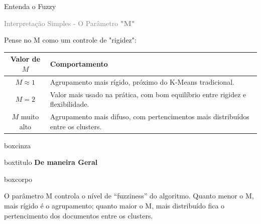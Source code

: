 \documentclass[aspectratio=43]{beamer}
\begin{document}
\begin{frame}[t]{Entenda o Fuzzy}

\textcolor{gray}{\large Interpretação Simples - O Parâmetro \textbf{"M"}}

\vspace{0.3cm}

Pense no M como um controle de "rigidez":

\begin{center}
\footnotesize
\begin{tabular}{|c|P{6.5cm}|}
\hline
\textbf{Valor de $M$} & \textbf{Comportamento} \\
\hline
$M \approx 1$ & Agrupamento mais rígido, próximo do K-Means tradicional. \\
\hline
$M = 2$ & Valor mais usado na prática, com bom equilíbrio entre rigidez e flexibilidade. \\
\hline
$M$ muito alto & Agrupamento mais difuso, com pertencimentos mais distribuídos entre os clusters. \\
\hline
\end{tabular}
\end{center}

\vspace{0.2cm}

\begin{center}
\begin{beamercolorbox}[
    wd=0.80\paperwidth,
    sep=0pt
]{boxcinza}

    \begin{beamercolorbox}[
        wd=0.80\paperwidth,
        ht=0.55cm,
        dp=0.12cm,
        sep=0pt
    ]{boxtitulo}
        \hspace*{0.25cm}%
        {\color{uelgreen}\textbf{De maneira Geral}}
    \end{beamercolorbox}

    \begin{beamercolorbox}[
        wd=0.80\paperwidth,
        sep=0pt
    ]{boxcorpo}
        \vspace{0.20cm}

        \hspace*{0.25cm}%
        \begin{minipage}{0.73\paperwidth}
            \small
            O parâmetro M controla o nível de “fuzziness” do algoritmo. Quanto menor o M, mais rígido é o agrupamento; quanto maior o M, mais distribuído fica o pertencimento dos documentos entre os clusters.
        \end{minipage}

        \vspace{0.20cm}
    \end{beamercolorbox}

\end{beamercolorbox}
\end{center}

\end{frame}
\end{document}
